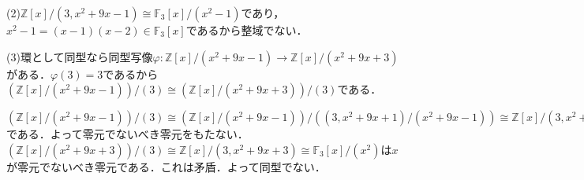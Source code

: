 \documentclass[
		book,
		head_space=20mm,
		foot_space=20mm,
		gutter=10mm,
		line_length=190mm
]{jlreq}
\begin{document}
(2)$\mathbb{Z}[x]/(3,x^2+9x-1)\cong \mathbb{F}_3[x]/(x^2-1)$であり，$x^2-1=(x-1)(x-2)\in \mathbb{F}_3[x]$であるから整域でない．

(3)環として同型なら同型写像$\varphi\colon \mathbb{Z}[x]/(x^2+9x-1)\rightarrow \mathbb{Z}[x]/(x^2+9x+3)$がある．$\varphi(3)=3$であるから$(\mathbb{Z}[x]/(x^2+9x-1))/(3)\cong (\mathbb{Z}[x]/(x^2+9x+3))/(3)$である．

$(\mathbb{Z}[x]/(x^2+9x-1))/(3)\cong (\mathbb{Z}[x]/(x^2+9x-1))/((3,x^2+9x+1)/(x^2+9x-1))\cong \mathbb{Z}[x]/(3,x^2+9x-1)\cong \mathbb{F}_3[x]/(x^2-1)\cong \mathbb{F}_3[x]/(x-1)\times \mathbb{F}_3[x]/(x-2)\cong \mathbb{F}_3^2$である．よって零元でないべき零元をもたない．
$(\mathbb{Z}[x]/(x^2+9x+3))/(3)\cong \mathbb{Z}[x]/(3,x^2+9x+3)\cong \mathbb{F}_3[x]/(x^2)$は$x$が零元でないべき零元である．これは矛盾．よって同型でない．
\end{document}
